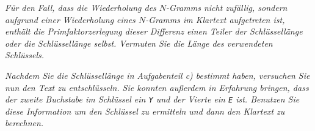 \documentclass[
  ngerman,
  DIV=12
]{scrartcl}
\begin{document}
\bigskip\noindent
\emph{Für den Fall, dass die Wiederholung des $N$-Gramms nicht zufällig, sondern aufgrund einer Wiederholung eines $N$-Gramms im Klartext aufgetreten ist, enthält die Primfaktorzerlegung dieser Differenz einen Teiler der Schlüssellänge oder die Schlüssellänge selbst. Vermuten Sie die Länge des verwendeten Schlüssels.}

\bigskip\noindent
\emph{Nachdem Sie die Schlüssellänge in Aufgabenteil c) bestimmt haben, versuchen Sie nun den Text zu entschlüsseln. Sie konnten außerdem in Erfahrung bringen, dass der zweite Buchstabe im Schlüssel ein \texttt{Y} und der Vierte ein \texttt{E} ist. Benutzen Sie diese Information um den Schlüssel zu ermitteln und dann den Klartext zu berechnen.}




\end{document}
